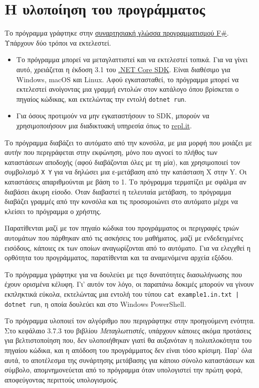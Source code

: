 \documentclass{article}
\begin{document}
\section{Η υλοποίηση του προγράμματος}

Το πρόγραμμα γράφτηκε στην \href{https://fsharp.org}{συναρτησιακή γλώσσα προγραμματισμού F\#}. Υπάρχουν δύο τρόποι να εκτελεστεί.

\begin{itemize}
    \item Το πρόγραμμα μπορεί να μεταγλαττιστεί και να εκτελεστεί τοπικά. Για να γίνει αυτό, χρειάζεται η έκδοση 3.1 του \href{https://dotnet.microsoft.com/download}{.NET Core SDK}. Είναι διαθέσιμο για Windows, macOS και Linux. Αφού εγκατασταθεί, το πρόγραμμα μπορεί να εκτελεστεί ανοίγοντας μια γραμμή εντολών στον κατάλογο όπου βρίσκεται ο πηγαίος κώδικας, και εκτελώντας την εντολή \texttt{dotnet run}.
    \item Για όσους προτιμούν να μην εγκαταστήσουν το SDK, μπορούν να χρησιμοποιήσουν μια διαδικτυακή υπηρεσία όπως το \href{https://repl.it/languages/fsharp}{repl.it}.
\end{itemize}

Το πρόγραμμα διαβάζει το αυτόματο από την κονσόλα, με μια μορφή που μοιάζει με αυτήν που περιγράφεται στην εκφώνηση, μόνο που αγνοεί το πλήθος των καταστάσεων αποδοχής (αφού διαβάζονται όλες με τη μία), και χρησιμοποιεί τον συμβολισμό \texttt{X Y} για να δηλώσει μια ε-μετάβαση από την κατάσταση X στην Y. Οι καταστάσεις απαριθμούνται με βάση το 1. Το πρόγραμμα τερματίζει με σφάλμα αν διαβάσει άκυρη είσοδο. Όταν διαβαστεί η τελευταία μετάβαση, το πρόγραμμα διαβάζει γραμμές από την κονσόλα και τις προσομοιώνει στο αυτόματο μέχρι να κλείσει το πρόγραμμα ο χρήστης.

Παρατίθενται μαζί με τον πηγαίο κώδικα του προγράμματος οι περιγραφές τριών αυτομάτων που πάρθηκαν από τις ασκήσεις του μαθήματος, μαζί με ενδεδειγμένες εισόδους, κάποιες εκ των οποίων αναγωρίζονται από το αυτόματο. Για να ελεγχθεί η ορθότητα του προγράμματος, παρατίθενται και τα αναμενόμενα αρχεία εξόδου.

Το πρόγραμμα γράφτηκε για να δουλεύει με τιςσ δυνατότητες διασωλήνωσης που έχουν ορισμένα κέλυφη. Γι' αυτόν τον λόγο, οι παραπάνω δοκιμές μπορούν να γίνουν εκπληκτικά εύκολα, εκτελώντας μια εντολή του τύπου \texttt{cat example1.in.txt | dotnet run}, η οποία δουλεύει και στο Windows PowerShell.

Το πρόγραμμα υλοποιεί τον αλγόριθμο που περιγράφτηκε στην προηγούμενη ενότητα. Στο κεφάλαιο 3.7.3 του βιβλίου \textit{Μεταγλωττιστές}, υπάρχουν κάποιες ακόμα προτάσεις για βελτιστοποίηση που, δεν υλοποιήθηκαν γιατί θα αυξανόταν η πολυπλοκότητα του πηγαίου κώδικα, και η απόδοση του προγράμματος δεν είναι τόσο κρίσιμη. Παρ' όλα αυτά, το αποτέλεσμα της συνάρτησης μετάβασης για κάποιο σύνολο καταστάσεων και σύμβολο, απομνημονεύεται από το πρόγραμμα όταν υπολογιστεί την πρώτη φορά, αποφεύγοντας περιττούς υπολογισμούς.
\end{document}
